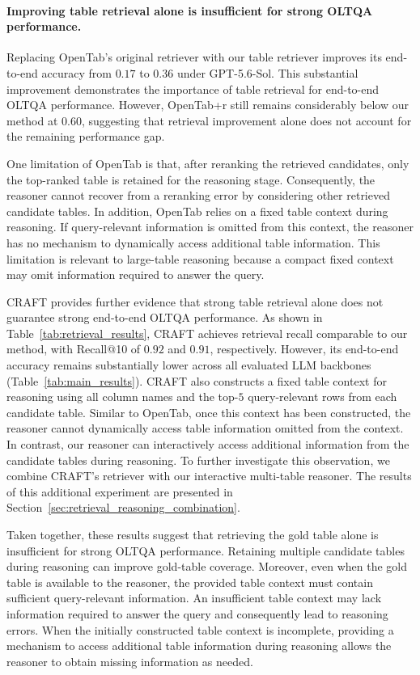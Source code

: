 \paragraph{Improving table retrieval alone is insufficient for strong OLTQA performance.}
Replacing OpenTab's original retriever with our table retriever improves its end-to-end accuracy from $0.17$ to $0.36$ under GPT-5.6-Sol.
This substantial improvement demonstrates the importance of table retrieval for end-to-end OLTQA performance.
However, OpenTab+r still remains considerably below our method at $0.60$, suggesting that retrieval improvement alone does not account for the remaining performance gap.

One limitation of OpenTab is that, after reranking the retrieved candidates, only the top-ranked table is retained for the reasoning stage.
Consequently, the reasoner cannot recover from a reranking error by considering other retrieved candidate tables.
In addition, OpenTab relies on a fixed table context during reasoning.
If query-relevant information is omitted from this context, the reasoner has no mechanism to dynamically access additional table information.
This limitation is relevant to large-table reasoning because a compact fixed context may omit information required to answer the query.

CRAFT provides further evidence that strong table retrieval alone does not guarantee strong end-to-end OLTQA performance.
As shown in Table~\ref{tab:retrieval_results}, CRAFT achieves retrieval recall comparable to our method, with Recall@10 of $0.92$ and $0.91$, respectively.
However, its end-to-end accuracy remains substantially lower across all evaluated LLM backbones (Table~\ref{tab:main_results}).
CRAFT also constructs a fixed table context for reasoning using all column names and the top-$5$ query-relevant rows from each candidate table.
Similar to OpenTab, once this context has been constructed, the reasoner cannot dynamically access table information omitted from the context.
In contrast, our reasoner can interactively access additional information from the candidate tables during reasoning.
To further investigate this observation, we combine CRAFT's retriever with our interactive multi-table reasoner. The results of this additional experiment are presented in Section~\ref{sec:retrieval_reasoning_combination}.


Taken together, these results suggest that retrieving the gold table alone is insufficient for strong OLTQA performance.
Retaining multiple candidate tables during reasoning can improve gold-table coverage.
Moreover, even when the gold table is available to the reasoner, the provided table context must contain sufficient query-relevant information.
An insufficient table context may lack information required to answer the query and consequently lead to reasoning errors.
When the initially constructed table context is incomplete, providing a mechanism to access additional table information during reasoning allows the reasoner to obtain missing information as needed.

